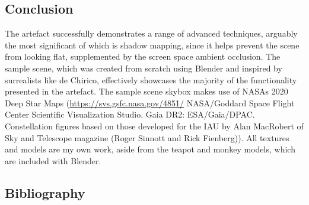 \documentclass[
]{article}
\begin{document}
{\hypertarget{conclusion}{%
\subsection{Conclusion}\label{conclusion}}

The artefact successfully demonstrates a range of advanced techniques,
arguably the most significant of which is shadow mapping, since it helps
prevent the scene from looking flat, supplemented by the screen space
ambient occlusion. The sample scene, which was created from scratch
using Blender and inspired by surrealists like de Chirico, effectively
showcases the majority of the functionality presented in the artefact.
The sample scene skybox makes use of NASAs 2020 Deep Star Maps
(\url{https://svs.gsfc.nasa.gov/4851/} NASA/Goddard Space Flight Center
Scientific Visualization Studio. Gaia DR2: ESA/Gaia/DPAC. Constellation
figures based on those developed for the IAU by Alan MacRobert of Sky
and Telescope magazine (Roger Sinnott and Rick Fienberg)). All textures and models are my own work, aside from the teapot and monkey models, which are included with Blender.

\hypertarget{bibliography}{%
\subsection{Bibliography}\label{bibliography}}

}
\end{document}
